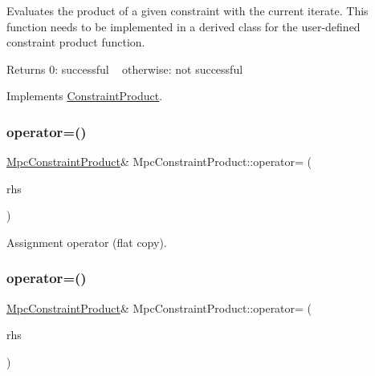 Evaluates the product of a given constraint with the current iterate. This function needs to be implemented in a derived class for the user-\/defined constraint product function. \begin{DoxyReturn}{Returns}
0\+: successful ~\newline
 otherwise\+: not successful 
\end{DoxyReturn}


Implements \hyperlink{class_constraint_product_a597e1001d283a43844b4bb8d45d6b9bd}{Constraint\+Product}.

\mbox{\label{class_mpc_constraint_product_a9308d0ae70e3a791f9efcff0405f74e4}} 
\subsubsection{\texorpdfstring{operator=()}{operator=()}\hspace{0.1cm}{\footnotesize\ttfamily [1/2]}}
{\footnotesize\ttfamily \hyperlink{class_mpc_constraint_product}{Mpc\+Constraint\+Product}\& Mpc\+Constraint\+Product\+::operator= (\begin{DoxyParamCaption}\item[{const \hyperlink{class_mpc_constraint_product}{Mpc\+Constraint\+Product} \&}]{rhs }\end{DoxyParamCaption})\hspace{0.3cm}{\ttfamily [inline]}}

Assignment operator (flat copy). \mbox{\label{class_mpc_constraint_product_a9308d0ae70e3a791f9efcff0405f74e4}} 
\subsubsection{\texorpdfstring{operator=()}{operator=()}\hspace{0.1cm}{\footnotesize\ttfamily [2/2]}}
{\footnotesize\ttfamily \hyperlink{class_mpc_constraint_product}{Mpc\+Constraint\+Product}\& Mpc\+Constraint\+Product\+::operator= (\begin{DoxyParamCaption}\item[{const \hyperlink{class_mpc_constraint_product}{Mpc\+Constraint\+Product} \&}]{rhs }\end{DoxyParamCaption})\hspace{0.3cm}{\ttfamily [inline]}}

